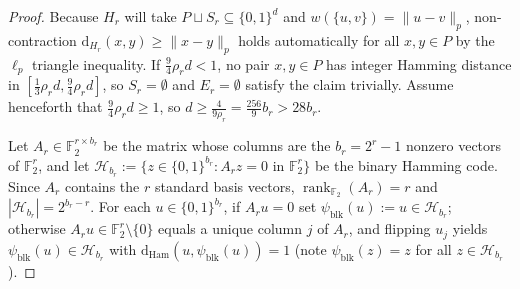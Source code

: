 \documentclass[11pt]{article}
\theoremstyle{definition}
\theoremstyle{remark}
\newcommand{\Ham}{\mathrm{Ham}}
\newcommand{\dHam}{\mathrm{d}_{\Ham}}
\begin{document}
\begin{proof}
Because $H_r$ will take $P \sqcup S_r \subseteq \{0, 1\}^d$ and $w(\{u, v\}) = \|u - v\|_p$, non-contraction $\mathrm{d}_{H_r}(x, y) \ge \|x - y\|_p$ holds automatically for all $x, y \in P$ by the $\ell_p$ triangle inequality. If $\frac{9}{4}\rho_r d < 1$, no pair $x, y \in P$ has integer Hamming distance in $[\frac{1}{3}\rho_r d, \frac{9}{4}\rho_r d]$, so $S_r = \emptyset$ and $E_r = \emptyset$ satisfy the claim trivially. Assume henceforth that $\frac{9}{4}\rho_r d \ge 1$, so $d \ge \frac{4}{9 \rho_r} = \frac{256}{9} b_r > 28 b_r$.

Let $A_r \in \mathbb{F}_2^{r \times b_r}$ be the matrix whose columns are the $b_r = 2^r - 1$ nonzero vectors of $\mathbb{F}_2^r$, and let $\mathcal{H}_{b_r} := \{z \in \{0, 1\}^{b_r} : A_r z = 0 \text{ in } \mathbb{F}_2^r\}$ be the binary Hamming code. Since $A_r$ contains the $r$ standard basis vectors, $\operatorname{rank}_{\mathbb{F}_2}(A_r) = r$ and $|\mathcal{H}_{b_r}| = 2^{b_r - r}$. For each $u \in \{0, 1\}^{b_r}$, if $A_r u = 0$ set $\psi_{\mathrm{blk}}(u) := u \in \mathcal{H}_{b_r}$; otherwise $A_r u \in \mathbb{F}_2^r \setminus \{0\}$ equals a unique column $j$ of $A_r$, and flipping $u_j$ yields $\psi_{\mathrm{blk}}(u) \in \mathcal{H}_{b_r}$ with $\dHam(u, \psi_{\mathrm{blk}}(u)) = 1$ (note $\psi_{\mathrm{blk}}(z) = z$ for all $z \in \mathcal{H}_{b_r}$).


\end{proof}
\end{document}
